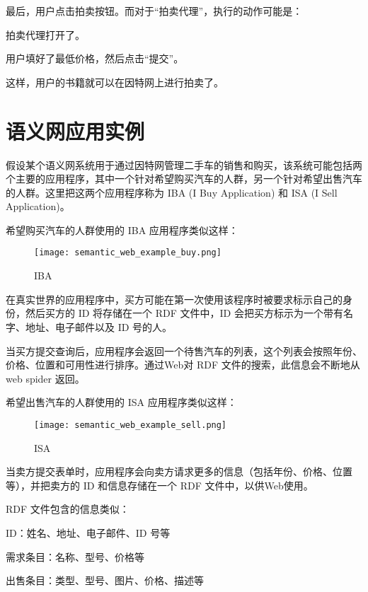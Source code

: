 最后，用户点击拍卖按钮。而对于“拍卖代理”，执行的动作可能是：

\begin{compactitem}
\item 拍卖代理打开了。
\item 用户填好了最低价格，然后点击“提交”。
\end{compactitem}

这样，用户的书籍就可以在因特网上进行拍卖了。


\section{语义网应用实例}


假设某个语义网系统用于通过因特网管理二手车的销售和购买，该系统可能包括两个主要的应用程序，其中一个针对希望购买汽车的人群，另一个针对希望出售汽车的人群。这里把这两个应用程序称为 IBA (I Buy Application) 和 ISA (I Sell Application)。

希望购买汽车的人群使用的 IBA 应用程序类似这样：

\begin{figure}[!h]
\centering
\texttt{[image: semantic\_web\_example\_buy.png]}
\caption{IBA}
\label{semantic_web_example_buy}
\end{figure}


在真实世界的应用程序中，买方可能在第一次使用该程序时被要求标示自己的身份，然后买方的 ID 将存储在一个 RDF 文件中，ID 会把买方标示为一个带有名字、地址、电子邮件以及 ID 号的人。

当买方提交查询后，应用程序会返回一个待售汽车的列表，这个列表会按照年份、价格、位置和可用性进行排序。通过Web对 RDF 文件的搜索，此信息会不断地从 web spider 返回。

希望出售汽车的人群使用的 ISA 应用程序类似这样：

\begin{figure}[!h]
\centering
\texttt{[image: semantic\_web\_example\_sell.png]}
\caption{ISA}
\label{semantic_web_example_sell}
\end{figure}


当卖方提交表单时，应用程序会向卖方请求更多的信息（包括年份、价格、位置等），并把卖方的 ID 和信息存储在一个 RDF 文件中，以供Web使用。

RDF 文件包含的信息类似：

\begin{compactitem}
\item ID：姓名、地址、电子邮件、ID 号等
\item 需求条目：名称、型号、价格等
\item 出售条目：类型、型号、图片、价格、描述等
\end{compactitem}

